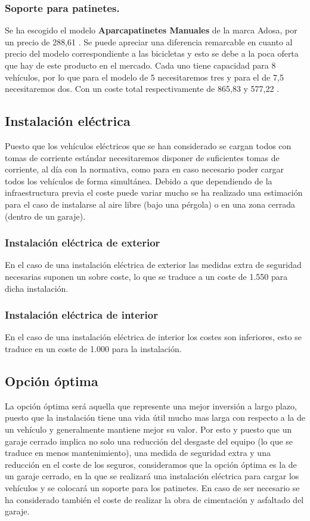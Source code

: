 \subsubsection{Soporte para patinetes.}

Se ha escogido el modelo \textbf{Aparcapatinetes Manuales} de la marca Adosa, por un precio de 288,61 . Se puede apreciar una diferencia remarcable en cuanto al precio del modelo correspondiente a las bicicletas y esto se debe a la poca oferta que hay de este producto en el mercado. Cada uno tiene capacidad para 8 vehículos, por lo que para el modelo de 5  necesitaremos tres y para el de 7,5  necesitaremos dos. Con un coste total respectivamente de 865,83  y 577,22 .
  
\subsection{Instalación eléctrica}
 Puesto que los vehículos eléctricos que se han considerado se cargan todos con tomas de corriente estándar necesitaremos disponer de suficientes tomas de corriente, al día con la normativa, como para en caso necesario poder cargar todos los vehículos de forma simultánea. Debido a que dependiendo de la infraestructura previa el coste puede variar mucho se ha realizado una estimación para el caso de instalarse al aire libre (bajo una pérgola) o en una zona cerrada (dentro de un garaje).
 
 \subsubsection{Instalación eléctrica de exterior}
 En el caso de una instalación eléctrica de exterior las medidas extra de seguridad necesarias suponen un sobre coste, lo que se traduce a un coste de 1.550  para dicha instalación.
 
 \subsubsection{Instalación eléctrica de interior}
 En el caso de una instalación eléctrica de interior los costes son inferiores, esto se traduce en un coste de 1.000  para la instalación.

\subsection{Opción óptima}
La opción óptima será aquella que represente una mejor inversión a largo plazo, puesto que la instalación tiene una vida útil mucho mas larga con respecto a la de un vehículo y generalmente mantiene mejor su valor. Por esto y puesto que un garaje cerrado implica no solo una reducción del desgaste del equipo (lo que se traduce en menos mantenimiento), una medida de seguridad extra y una reducción en el coste de los seguros, consideramos que la opción óptima es la de un garaje cerrado, en la que se realizará una instalación eléctrica para cargar los vehículos y se colocará un soporte para los patinetes. En caso de ser necesario se ha considerado también el coste de realizar la obra de cimentación y asfaltado del garaje.

